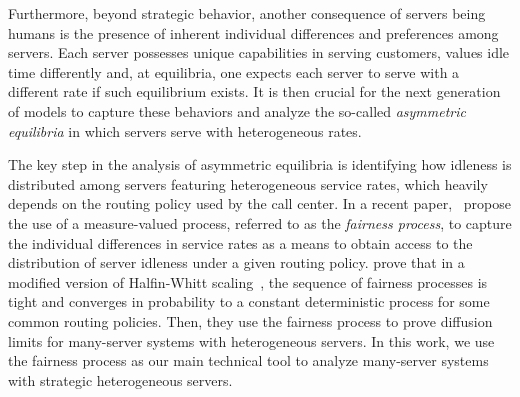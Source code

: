 \documentclass[a4paper,11pt,twoside]{article}
\numberwithin{equation}{section}
\numberwithin{figure}{section}
\theoremstyle{plain}
\newcommand{\1}{\mathbbm{1}}
\begin{document}
Furthermore, beyond strategic behavior, another consequence of servers being humans is the presence of inherent individual differences and preferences among servers. Each server possesses unique capabilities in serving customers, values idle time differently and, at equilibria, one expects each server to serve with a different rate if such equilibrium exists. It is then crucial for the next generation of models to capture these behaviors and analyze the so-called \textit{asymmetric equilibria} in which servers serve with heterogeneous rates. %

The key step in the analysis of asymmetric equilibria is identifying how idleness is distributed among servers featuring heterogeneous service rates, which heavily depends on the routing policy used by the call center. In a recent paper,~\cite{bukeqin2019} propose the use of a measure-valued process, referred to as the \emph{fairness process}, to capture the individual differences in service rates as a means to obtain access to the distribution of server idleness under a given routing policy. \cite{bukeqin2019} prove that in a modified version of Halfin-Whitt scaling~\cite{halfinwhitt1981}, the sequence of fairness processes is tight and converges in probability to a constant deterministic process for some common routing policies. Then, they use the fairness process to prove diffusion limits for many-server systems with heterogeneous servers. In this work, we use the fairness process as our main technical tool to analyze many-server systems with strategic heterogeneous servers. 
\end{document}
